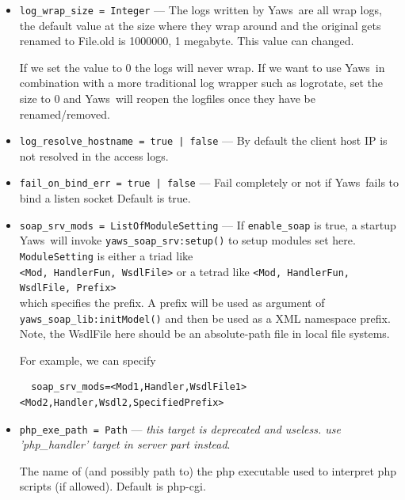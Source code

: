 \documentclass[11pt,oneside,english]{book}
\newcommand{\Yaws}            %
        {{\sc Yaws}}
\begin{document}
\begin{itemize}
\item        \verb+log_wrap_size = Integer+ ---
              The logs written by \Yaws\ are all wrap logs, the default value at
              the size where they wrap around and the original gets renamed to
              File.old is 1000000, 1 megabyte. This value can changed.


              If we set the value to 0 the logs will never wrap. If we want to
              use \Yaws\ in combination with a more traditional log wrapper such
              as logrotate, set the size to 0 and \Yaws\ will reopen the
              logfiles once they have be renamed/removed.

\item        \verb+log_resolve_hostname = true | false+ ---
              By default the client host IP is not resolved in the access logs.

\item        \verb+fail_on_bind_err = true | false+ ---
              Fail completely or not if \Yaws\ fails to bind a listen socket
              Default is true.

\item        \verb+soap_srv_mods = ListOfModuleSetting+ ---
              If \verb+enable_soap+ is true, a startup \Yaws\ will invoke
              \verb+yaws_soap_srv:setup()+ to setup modules set
              here. \verb+ModuleSetting+ is either a triad like\\
              \verb+<Mod, HandlerFun, WsdlFile>+ or a tetrad like
              \verb+<Mod, HandlerFun, WsdlFile, Prefix>+\\ which specifies the
              prefix. A prefix will be used as argument of
              \verb+yaws_soap_lib:initModel()+ and then be used as a XML
              namespace prefix.  Note, the WsdlFile here should be an
              absolute-path file in local file systems.

              For example, we can specify
\begin{verbatim}
  soap_srv_mods=<Mod1,Handler,WsdlFile1> <Mod2,Handler,Wsdl2,SpecifiedPrefix>
\end{verbatim}

\item        \verb+php_exe_path = Path+ ---
              \textit{this target is deprecated and useless. use 'php\_handler'
                target in server part instead}.

              The name of (and possibly path to) the php executable used to
              interpret php scripts (if allowed).  Default is php-cgi.


\end{itemize}
\end{document}
